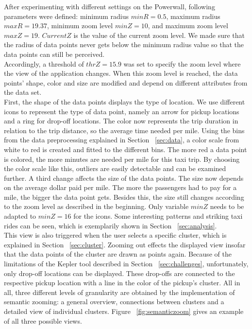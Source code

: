 \documentclass[sigconf, authorversion, nonacm=true]{acmart}
\begin{document}
After experimenting with different settings on the Powerwall, following parameters were defined: minimum radius $minR=0.5$, maximum radius $maxR = 19.37$, minimum zoom level $minZ = 10$, and maximum zoom level $maxZ = 19$. $CurrentZ$ is the value of the current zoom level. We made sure that the radius of data points never gets below the minimum radius value so that the data points can still be perceived.\\ 
Accordingly, a threshold of $thrZ = 15.9$ was set to specify the zoom level where the view of the application changes. When this zoom level is reached, the data points' shape, color and size are modified and depend on different attributes from the data set.\\
First, the shape of the data points displays the type of location. We use different icons to represent the type of data point, namely an arrow for pickup locations and a ring for drop-off locations. The color now represents the trip duration in relation to the trip distance, so the average time needed per mile. Using the bins from the data preprocessing explained in Section ~\ref{sec:data}, a color scale from white to red is created and fitted to the different bins. The more red a data point is colored, the more minutes are needed per mile for this taxi trip. By choosing the color scale like this, outliers are easily detectable and can be examined further. A third change affects the size of the data points. The size now depends on the average dollar paid per mile. The more the passengers had to pay for a mile, the bigger the data point gets. Besides this, the size still changes according to the zoom level as described in the beginning. Only variable $minZ$ needs to be adapted to $minZ = 16$ for the icons.
 Some interesting patterns and striking taxi rides can be seen, which is exemplarily shown in Section ~\ref{sec:analysis}. \\
This view is also triggered when the user selects a specific cluster, which is explained in Section ~\ref{sec:cluster}. Zooming out effects the displayed view insofar that the data points of the cluster are drawn as points again. Because of the limitations of the Kepler tool described in Section ~\ref{sec:challenges}, unfortunately, only drop-off locations can be displayed. These drop-offs are connected to the respective pickup location with a line in the color of the pickup's cluster. All in all, three different levels of granularity are obtained by the implementation of semantic zooming: a general overview, connections between clusters and a detailed view of individual clusters. Figure ~\ref{fig:semanticzoom} gives an example of all three possible views.
\end{document}
